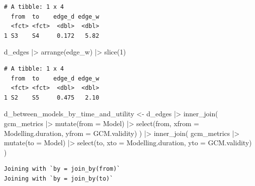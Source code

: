\documentclass[
  letterpaper,
  DIV=11,
  numbers=noendperiod]{scrartcl}
\newenvironment{Shaded}{\begin{snugshade}}{\end{snugshade}}
\newcommand{\AttributeTok}[1]{\textcolor[rgb]{0.40,0.45,0.13}{#1}}
\newcommand{\DecValTok}[1]{\textcolor[rgb]{0.68,0.00,0.00}{#1}}
\newcommand{\FunctionTok}[1]{\textcolor[rgb]{0.28,0.35,0.67}{#1}}
\newcommand{\NormalTok}[1]{\textcolor[rgb]{0.00,0.23,0.31}{#1}}
\newcommand{\OtherTok}[1]{\textcolor[rgb]{0.00,0.23,0.31}{#1}}
\newcommand{\SpecialCharTok}[1]{\textcolor[rgb]{0.37,0.37,0.37}{#1}}
\begin{document}
\begin{verbatim}
# A tibble: 1 x 4
  from  to    edge_d edge_w
  <fct> <fct>  <dbl>  <dbl>
1 S3    S4     0.172   5.82
\end{verbatim}

\begin{Shaded}
\begin{Highlighting}[]
\NormalTok{d\_edges }\SpecialCharTok{|\textgreater{}} 
    \FunctionTok{arrange}\NormalTok{(edge\_w) }\SpecialCharTok{|\textgreater{}} 
    \FunctionTok{slice}\NormalTok{(}\DecValTok{1}\NormalTok{)}
\end{Highlighting}
\end{Shaded}

\begin{verbatim}
# A tibble: 1 x 4
  from  to    edge_d edge_w
  <fct> <fct>  <dbl>  <dbl>
1 S2    S5     0.475   2.10
\end{verbatim}

\begin{Shaded}
\begin{Highlighting}[]
\NormalTok{d\_between\_models\_by\_time\_and\_utility }\OtherTok{\textless{}{-}} 
\NormalTok{    d\_edges }\SpecialCharTok{|\textgreater{}} 
    \FunctionTok{inner\_join}\NormalTok{(}
\NormalTok{        gcm\_metrics }\SpecialCharTok{|\textgreater{}} 
            \FunctionTok{mutate}\NormalTok{(}\AttributeTok{from =}\NormalTok{ Model) }\SpecialCharTok{|\textgreater{}} 
            \FunctionTok{select}\NormalTok{(from, }\AttributeTok{xfrom =}\NormalTok{ Modelling.duration, }\AttributeTok{yfrom =}\NormalTok{ GCM.validity)}
\NormalTok{    ) }\SpecialCharTok{|\textgreater{}} 
    \FunctionTok{inner\_join}\NormalTok{(}
\NormalTok{        gcm\_metrics }\SpecialCharTok{|\textgreater{}} 
            \FunctionTok{mutate}\NormalTok{(}\AttributeTok{to =}\NormalTok{ Model) }\SpecialCharTok{|\textgreater{}} 
            \FunctionTok{select}\NormalTok{(to, }\AttributeTok{xto =}\NormalTok{ Modelling.duration, }\AttributeTok{yto =}\NormalTok{ GCM.validity)}
\NormalTok{    ) }
\end{Highlighting}
\end{Shaded}

\begin{verbatim}
Joining with `by = join_by(from)`
Joining with `by = join_by(to)`
\end{verbatim}
\end{document}

